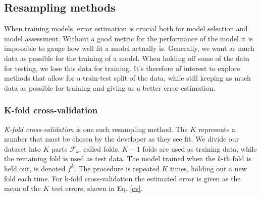 




\subsection{Resampling methods}

When training models, error estimation is crucial both for model selection and model assessment. Without a good metric for the performance of the model it is impossible to gauge how well fit a model actually is.
Generally, we want as much data as possible for the training of a model. When holding off some of the data for testing, we lose this data for training. It's therefore of interest to explore methods that allow for a train-test split of the data, while still keeping as much data as possible for training and giving us a better error estimation.

\subsubsection{K-fold cross-validation}
\textit{K-fold cross-validation} is one such resampling method. The $K$ represents a number that must be chosen by the developer as they see fit. We divide our dataset into $K$ parts $\mathcal{F}_k$, called folds. $K-1$ folds are used as training data, while the remaining fold is used as test data. The model trained when the $k$-th fold is held out, is denoted $f^{k}$. 
The procedure is repeated $K$ times, holding out a new fold each time. For k-fold cross-validation the estimated error is given as the mean of the $K$ test errors, shown in Eq. \ref{cv}. \citep[p. 241]{hastie}


